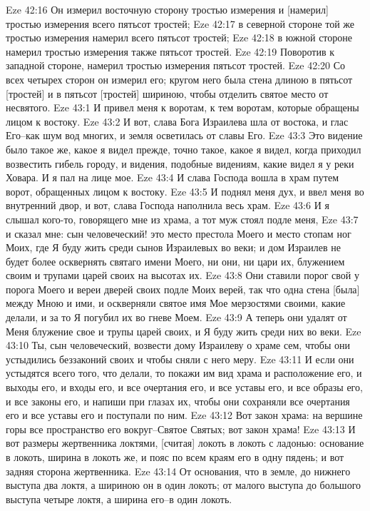 Eze 42:16  Он измерил восточную сторону тростью измерения и [намерил] тростью измерения всего пятьсот тростей;
Eze 42:17  в северной стороне той же тростью измерения намерил всего пятьсот тростей;
Eze 42:18  в южной стороне намерил тростью измерения также пятьсот тростей.
Eze 42:19  Поворотив к западной стороне, намерил тростью измерения пятьсот тростей.
Eze 42:20  Со всех четырех сторон он измерил его; кругом него была стена длиною в пятьсот [тростей] и в пятьсот [тростей] шириною, чтобы отделить святое место от несвятого.
Eze 43:1  И привел меня к воротам, к тем воротам, которые обращены лицом к востоку.
Eze 43:2  И вот, слава Бога Израилева шла от востока, и глас Его--как шум вод многих, и земля осветилась от славы Его.
Eze 43:3  Это видение было такое же, какое я видел прежде, точно такое, какое я видел, когда приходил возвестить гибель городу, и видения, подобные видениям, какие видел я у реки Ховара. И я пал на лице мое.
Eze 43:4  И слава Господа вошла в храм путем ворот, обращенных лицом к востоку.
Eze 43:5  И поднял меня дух, и ввел меня во внутренний двор, и вот, слава Господа наполнила весь храм.
Eze 43:6  И я слышал кого-то, говорящего мне из храма, а тот муж стоял подле меня,
Eze 43:7  и сказал мне: сын человеческий! это место престола Моего и место стопам ног Моих, где Я буду жить среди сынов Израилевых во веки; и дом Израилев не будет более осквернять святаго имени Моего, ни они, ни цари их, блужением своим и трупами царей своих на высотах их.
Eze 43:8  Они ставили порог свой у порога Моего и вереи дверей своих подле Моих верей, так что одна стена [была] между Мною и ими, и оскверняли святое имя Мое мерзостями своими, какие делали, и за то Я погубил их во гневе Моем.
Eze 43:9  А теперь они удалят от Меня блужение свое и трупы царей своих, и Я буду жить среди них во веки.
Eze 43:10  Ты, сын человеческий, возвести дому Израилеву о храме сем, чтобы они устыдились беззаконий своих и чтобы сняли с него меру.
Eze 43:11  И если они устыдятся всего того, что делали, то покажи им вид храма и расположение его, и выходы его, и входы его, и все очертания его, и все уставы его, и все образы его, и все законы его, и напиши при глазах их, чтобы они сохраняли все очертания его и все уставы его и поступали по ним.
Eze 43:12  Вот закон храма: на вершине горы все пространство его вокруг--Святое Святых; вот закон храма!
Eze 43:13  И вот размеры жертвенника локтями, [считая] локоть в локоть с ладонью: основание в локоть, ширина в локоть же, и пояс по всем краям его в одну пядень; и вот задняя сторона жертвенника.
Eze 43:14  От основания, что в земле, до нижнего выступа два локтя, а шириною он в один локоть; от малого выступа до большого выступа четыре локтя, а ширина его--в один локоть.
